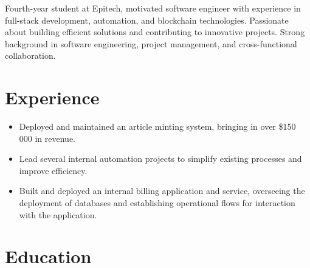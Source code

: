 \documentclass[11pt,a4paper,sans]{moderncv}
\begin{document}
\makecvtitle

Fourth-year student at Epitech, motivated software engineer with experience in full-stack development, automation, and blockchain technologies. 
Passionate about building efficient solutions and contributing to innovative projects. Strong background in software engineering, project management, and cross-functional collaboration.

\section{Experience}
{\begin{itemize}
    \item Deployed and maintained an article minting system, bringing in over \$150 000 in revenue.
\end{itemize}}
{\begin{itemize}
    \item Lead several internal automation projects to simplify existing processes and improve efficiency.
\end{itemize}}
{\begin{itemize}
    \item Built and deployed an internal billing application and service, overseeing the deployment of databases and establishing operational flows for interaction with the application.
\end{itemize}}

\section{Education}
\end{document}

